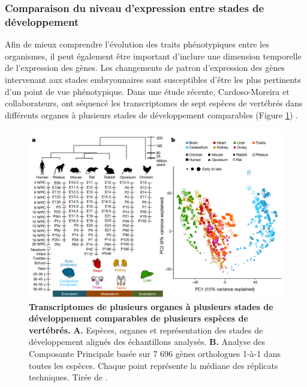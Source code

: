 \subsubsection{Comparaison du niveau d’expression entre stades de développement}
\label{subsub:variation-stade}

Afin de mieux comprendre l’évolution des traits phénotypiques entre les organismes, il peut également être important d’inclure une dimension temporelle de l’expression des gènes. Les changements de patron d’expression des gènes intervenant aux stades embryonnaires sont susceptibles d’être les plus pertinents d’un point de vue phénotypique. Dans une étude récente, Cardoso-Moreira et collaborateurs, ont séquencé les transcriptomes de sept espèces de vertébrés dans différents organes à plusieurs stades de développement comparables (Figure \ref{fig:Fig29}) \citep{cardoso-moreira_gene_2019}.

\begin{figure}[h]
    \centering
    \includegraphics[width=1\textwidth, page=1] {figures/introduction/fig29.png}
    \caption[Transcriptomes de plusieurs organes à plusieurs stades de développement comparables de plusieurs espèces de vertébrés.]{
    \textbf{Transcriptomes de plusieurs organes à plusieurs stades de développement comparables de plusieurs espèces de vertébrés.}
    \textbf{A.} Espèces, organes et représentation des stades de développement alignés des échantillons analysés. \textbf{B.} Analyse des Composante Principale basée sur 7 696 gènes orthologues 1-à-1 dans toutes les espèces. Chaque point représente la médiane des réplicats techniques. Tirée de \citep{cardoso-moreira_gene_2019}.\\
    }
    \label{fig:Fig29}
\end{figure}

